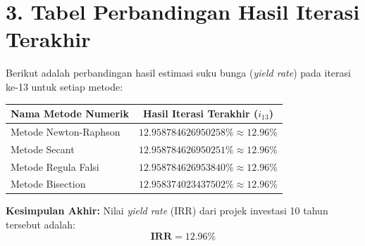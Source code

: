 \documentclass[11pt,a4paper]{article}
\begin{document}
\vspace{0.3em}

\section*{3. Tabel Perbandingan Hasil Iterasi Terakhir}

Berikut adalah perbandingan hasil estimasi suku bunga (\textit{yield rate}) pada iterasi ke-13 untuk setiap metode:

\begin{center}
\small
\begin{tabular}{lc}
\toprule
\textbf{Nama Metode Numerik} & \textbf{Hasil Iterasi Terakhir ($i_{13}$)} \\
\midrule
Metode Newton-Raphson & $\mathbf{12.958784626950258\% \approx 12.96\%}$ \\
Metode Secant & $\mathbf{12.958784626950251\% \approx 12.96\%}$ \\
Metode Regula Falsi & $\mathbf{12.958784626953840\% \approx 12.96\%}$ \\
Metode Bisection & $\mathbf{12.958374023437502\% \approx 12.96\%}$ \\
\bottomrule
\end{tabular}
\end{center}

\textbf{Kesimpulan Akhir:}
Nilai \textit{yield rate} (IRR) dari projek investasi 10 tahun tersebut adalah:
\begin{equation*}
    \mathbf{IRR = 12.96\%}
\end{equation*}
\end{document}
